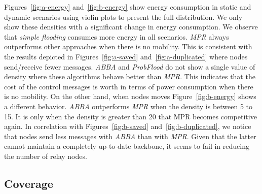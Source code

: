 %
Figures~\ref{fig:a-energy} and~\ref{fig:b-energy} show energy consumption in static and dynamic scenarios using violin plots to present the full distribution.
%
We only show these densities with a significant change in energy consumption. 
% 
We observe that \emph{simple flooding} consumes more energy in all scenarios.
%
\emph{MPR} always outperforms other approaches when there is no mobility.
%
This is consistent with the results depicted in Figures~\ref{fig:a-saved} and~\ref{fig:a-duplicated} where nodes send/receive fewer messages.
%
\emph{ABBA} and \emph{ProbFlood} do not show a single value of density where these algorithms behave better than \emph{MPR}. 
%
This indicates that the cost of the control messages is worth in terms of power consumption when there is no mobility.
On the other hand, when nodes moves Figure~\ref{fig:b-energy} shows a different behavior. 
%
\emph{ABBA} outperforms \emph{MPR} when the density is between 5 to 15.
%
It is only when the density is greater than 20 that MPR becomes competitive again.
%
In correlation with Figures~\ref{fig:b-saved} and~\ref{fig:b-duplicated}, we notice that nodes send less messages with \emph{ABBA} than with \emph{MPR}.
%
%
%
Given that the latter cannot maintain a completely up-to-date backbone, it seems to fail in reducing the number of relay nodes.
%
%

\subsection{Coverage}
\vspace{-1mm}

